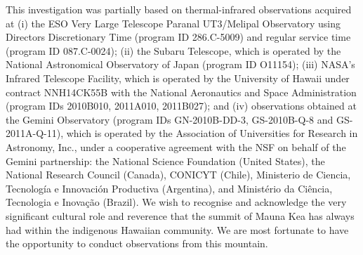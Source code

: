 \documentclass[final,authoryear,5p,times,twocolumn]{elsarticle}
\begin{document}
This investigation was partially based on thermal-infrared observations acquired at (i) the ESO Very Large Telescope Paranal UT3/Melipal Observatory using Directors Discretionary Time (program ID 286.C-5009) and regular service time (program ID 087.C-0024); (ii) the Subaru Telescope, which is operated by the National Astronomical Observatory of Japan (program ID O11154); (iii) NASA's Infrared Telescope Facility,  which is operated by the University of Hawaii under contract NNH14CK55B with the National Aeronautics and Space Administration (program IDs  2010B010, 2011A010, 2011B027); and (iv) observations obtained at the Gemini Observatory (program IDs GN-2010B-DD-3, GS-2010B-Q-8 and GS-2011A-Q-11), which is operated by the Association of Universities for Research in Astronomy, Inc., under a cooperative agreement with the NSF on behalf of the Gemini partnership: the National Science Foundation (United States), the National Research Council (Canada), CONICYT (Chile), Ministerio de Ciencia, Tecnolog\'{i}a e Innovaci\'{o}n Productiva (Argentina), and Minist\'{e}rio da Ci\^{e}ncia, Tecnologia e Inova\c{c}\~{a}o (Brazil).  We wish to recognise and acknowledge the very significant cultural role and reverence that the summit of Mauna Kea has always had within the indigenous Hawaiian community.  We are most fortunate to have the opportunity to conduct observations from this mountain.


%

\end{document}
